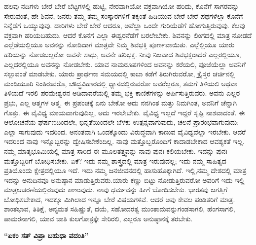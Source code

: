 ಹಲವು ನದಿಗಳು ಬೇರೆ ಬೇರೆ ಬೆಟ್ಟಗಳಲ್ಲಿ ಹುಟ್ಟಿ, ನೇರವಾಗಿಯೋ ವಕ್ರವಾಗಿಯೋ ಹರಿದು, ಕೊನೆಗೆ ಸಾಗರವನ್ನು ಸೇರುವಂತೆ, ಹೇ ಶಿವನೆ, ಜನರು ತಮ್ಮ ತಮ್ಮ ಸಂಸ್ಕಾರಗಳಿಗೆ ತಕ್ಕಂತೆ ಹಿಡಿಯುವ ಬೇರೆ ಬೇರೆ ಪಥಗಳೆಲ್ಲಾ ಕೊನೆಗೆ ನಿನ್ನೆಡೆಗೆ ಒಯ್ಯುವುವು. ದಾರಿಗಳು ಬೇರೆ ಬೇರೆ ಆದರೂ, ಅವೆಲ್ಲಾ ಒಂದೇ ಗುರಿಯೆಡೆಗೆ ಹೋಗುತ್ತಿರುವುವು. ಕೆಲವು ವಕ್ರವಾಗಿ ಹರಿಯಬಹುದು. ಆದರೆ ಕೊನೆಗೆ ಎಲ್ಲಾ ಈಶ್ವರನೆಡೆಗೆ ಬರಲೇಬೇಕು. ಶಿವನನ್ನು ಲಿಂಗದಲ್ಲಿ ಮಾತ್ರ ನೋಡದೆ ಎಲ್ಲೆಡೆಯಲ್ಲಿಯೂ ಅವನನ್ನು ನೋಡಿದಾಗ ಮಾತ್ರವೇ ನಿಮ್ಮ ಶಿವಭಕ್ತಿ ಪೂರ್ಣವಾಯಿತು. ಎಲ್ಲೆಲ್ಲಿಯೂ ಯಾರು ಹರಿಯನ್ನು ನೋಡಬಲ್ಲರೋ ಅವನೇ ಸಾಧು, ಅವನೇ ಹರಿಭಕ್ತ. ನೀವು ನಿಜವಾದ ಶಿವಭಕ್ತರಾದರೆ ಎಲ್ಲರಲ್ಲಿಯೂ, ಎಲ್ಲದರಲ್ಲಿಯೂ ಅವನನ್ನು ನೋಡಬೇಕು. ಯಾವ ನಾಮರೂಪಗಳಿಂದ ಅವನನ್ನು ಕರೆಯಲಿ, ಪೂಜೆಯೆಲ್ಲಾ ಅವನಿಗೆ ಸಲ್ಲುವಂತೆ ಮಾಡಬೇಕು. ಯಾರು ಪ್ರಾರ್ಥನಾ ಸಮಯದಲ್ಲಿ ಕಾಬಾ ಕಡೆಗೆ ತಿರುಗಿರುವರೋ, ಕ್ರೈಸ್ತರ ಚರ್ಚಿನಲ್ಲಿ ಮಂಡಿಯೂರಿ ನಿಂತಿರುವರೊ, ಬೌದ್ಧವಿಹಾರದಲ್ಲಿ ಧ್ಯಾನದಲ್ಲಿರುವರೋ ಅವರೆಲ್ಲರೂ, ತಮಗೆ ತಿಳಿಯಲಿ ಅಥವಾ ತಿಳಿಯದೆ ಇರಲಿ ಪರಮೇಶ್ವರನ ಅಡಿದಾವರೆಯಲ್ಲಿ ತಮ್ಮ ಭಕ್ತಿ ಕಾಣಿಕೆಗಳನ್ನು ಅರ್ಪಿಸುತ್ತಿರುವರು. ಅವನು ಎಲ್ಲರ ಪ್ರಭು, ಎಲ್ಲ ಆತ್ಮಗಳ ಆತ್ಮ. ಈ ಪ್ರಪಂಚಕ್ಕೆ ಏನು ಬೇಕೋ ಅದು ನನಗಿಂತ ಮತ್ತು ನಿಮಗಿಂತ, ಅವನಿಗೆ ಚೆನ್ನಾಗಿ ಗೊತ್ತು. ಈ ವೈವಿಧ್ಯ ಮಾಯವಾಗುವುದಿಲ್ಲ, ಅದು ಇರಲೇಬೇಕು. ವೈವಿಧ್ಯ ಇಲ್ಲದೆ ಇದ್ದರೆ ಸೃಷ್ಟಿ ನಾಶವಾದಂತೆ. ಈ ಆಲೋಚನೆಯ ಘರ್ಷಣದಿಂದಲೇ, ಭಿನ್ನತೆಯಿಂದಲೇ ಬೆಳಕು ಉತ್ಪನ್ನವಾಗುವುದು, ಚಲನೆ ಪ್ರಾರಂಭವಾಗುವುದು; ಎಲ್ಲಾ ಸಾಗುವುದು ಇದರಿಂದ. ಅನಂತವಾಗಿ ಒಂದಕ್ಕೊಂದು ವಿರುದ್ಧವಾಗಿ ಕಾಣುವ ವೈವಿಧ್ಯವೆಲ್ಲಾ ಇರಬೇಕು. ಆದರೆ ಇದರಿಂದ ನಾವು ಇನ್ನೊಬ್ಬರನ್ನು ದ್ವೇಷಿಸಬೇಕೆಂದಿಲ್ಲ. ನಾವು ಮತ್ತೊಬ್ಬರೊಂದಿಗೆ ಕಾದಾಡಬೇಕಾದ ಆವಶ್ಯಕತೆ ಇಲ್ಲ. ನಮ್ಮ ಮಾತೃಭೂಮಿಯಲ್ಲಿ ಮಾತ್ರ ಸಾರಿದ ಈ ಮೂಲತತ್ತ್ವವನ್ನು ನಾವು ಪುನಃ ಕಲಿಯಬೇಕು. ಇದನ್ನು ಪುನಃ ಮತ್ತೊಬ್ಬರಿಗೆ ಬೋಧಿಸಬೇಕು. ಏಕೆ? ಇದು ನಮ್ಮ ಶಾಸ್ತ್ರದಲ್ಲಿ ಮಾತ್ರ ಇರುವುದಲ್ಲ; ಇದು ನಮ್ಮ ಸಾಹಿತ್ಯದ ಪ್ರತಿಯೊಂದು ಕ್ಷೇತ್ರದಲ್ಲಿಯೂ ಇದೆ. ಇದು ನಮ್ಮ ಜನಜೀವನದಲ್ಲಿ ಹಾಸುಹೊಕ್ಕಾಗಿದೆ. ಇಲ್ಲಿ,\break ನಮ್ಮ ದೇಶದಲ್ಲಿ ಮಾತ್ರ ಇದನ್ನು ಅನುದಿನವೂ ಅನುಷ್ಠಾನ ಮಾಡುತ್ತಿರುವರು.\break ಯಾರು ಕಣ್ಣು ಬಿಟ್ಟು ನೋಡುತ್ತಿರುವರೋ ಅವರಿಗೆ ಇದು ಇಲ್ಲಿ ಮಾತ್ರ\break ಆಚರಣೆಯಲ್ಲಿರುವುದು ಕಾಣುವುದು. ನಾವು ಧರ್ಮವನ್ನು ಹೀಗೆ ಬೋಧಿಸಬೇಕು. ಭಾರತವು ಜಗತ್ತಿಗೆ ಬೋಧಿಸಬೇಕಾದ, ಇದಕ್ಕೂ ಮಿಗಿಲಾದ ಇನ್ನೂ ಬೇರೆ ವಿಷಯಗಳಿವೆ. ಆದರೆ ಅವು ಕೇವಲ ಪಂಡಿತರಿಗೆ ಮಾತ್ರ. ಶಾಂತಭಾವ, ತಿತಿಕ್ಷೆ, ಅನ್ಯಮತ ಸಹಿಷ್ಣುತೆ, ದಯೆ, ಸಹೋದರತ್ವ ಮುಂತಾದುವನ್ನು\break ಗಂಡಸಾಗಲಿ, ಹೆಂಗಸಾಗಲಿ, ಪಾಮರನಾಗಲಿ, ಯಾವ ಜಾತಿ ಕುಲಗೋತ್ರಕ್ಕೇ ಸೇರಿರಲಿ, ಎಲ್ಲರೂ ಅನುಷ್ಠಾನಕ್ಕೆ ತರಬೇಕು.

\begin{center}
\textbf{“ಏಕಂ ಸತ್ ವಿಪ್ರಾ ಬಹುಧಾ ವದಂತಿ”}
\end{center}


